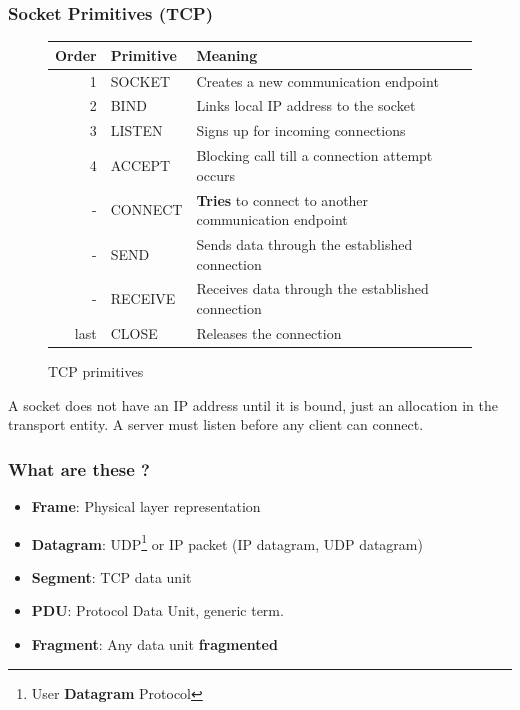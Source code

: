   \begin{frame}
    \frametitle{Socket Primitives (TCP)}
    \begin{figure}
      \centering
      \resizebox{10cm}{!} {
        \begin{tabular}{r|l|l}
          Order & Primitive & Meaning \\ \hline
          1     & SOCKET    & Creates a new communication endpoint \\ \hline
          2     & BIND      & Links local IP address to the socket \\ \hline
          3     & LISTEN    & Signs up for incoming connections \\ \hline
          4     & ACCEPT    & Blocking call till a connection attempt occurs \\ \hline
          -     & CONNECT   & \textbf{Tries} to connect to another communication endpoint \\ \hline
          -     & SEND      & Sends data through the established connection \\ \hline
          -     & RECEIVE   & Receives data through the established connection \\ \hline
          last  & CLOSE     & Releases the connection \\ \hline
        \end{tabular}
      }
      \caption{TCP primitives}
      \label{fig:primitives}
    \end{figure}
    A socket does not have an IP address until it is bound, just an allocation in the transport entity. A server must listen before any client can connect.
  \end{frame}

  \begin{frame}
    \frametitle{What are these  ?}
      \begin{itemize}
        \item \textbf{Frame}: Physical layer representation
        \item \textbf{Datagram}: UDP\footnote{User \textbf{Datagram} Protocol} or IP packet (IP datagram, UDP datagram)
        \item \textbf{Segment}: TCP data unit
        \item \textbf{PDU}: Protocol Data Unit, generic term.
        \item \textbf{Fragment}: Any data unit \textbf{fragmented}
      \end{itemize}
  \end{frame}
